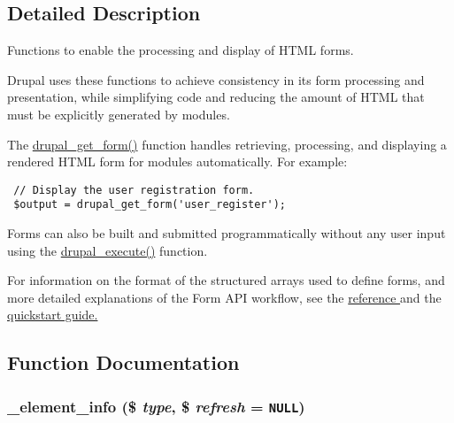 \subsection{Detailed Description}
Functions to enable the processing and display of HTML forms.

Drupal uses these functions to achieve consistency in its form processing and presentation, while simplifying code and reducing the amount of HTML that must be explicitly generated by modules.

The \hyperlink{group__form__api_g720df81a837b06dfe19daf1c1eea3437}{drupal\_\-get\_\-form()} function handles retrieving, processing, and displaying a rendered HTML form for modules automatically. For example:



\begin{Code}\begin{verbatim} // Display the user registration form.
 $output = drupal_get_form('user_register');
\end{verbatim}
\end{Code}



Forms can also be built and submitted programmatically without any user input using the \hyperlink{group__form__api_g06dfc84042a094ae6b40bc1840ccced8}{drupal\_\-execute()} function.

For information on the format of the structured arrays used to define forms, and more detailed explanations of the Form API workflow, see the \hyperlink{}{reference } and the \hyperlink{}{quickstart guide. } 

\subsection{Function Documentation}
\hypertarget{group__form__api_gf7ae46c60bcbf2300522efa0d910f20c}{
\subsubsection[{\_\-element\_\-info}]{\setlength{\rightskip}{0pt plus 5cm}\_\-element\_\-info (\$ {\em type}, \/  \$ {\em refresh} = {\tt NULL})}}
\label{group__form__api_gf7ae46c60bcbf2300522efa0d910f20c}


